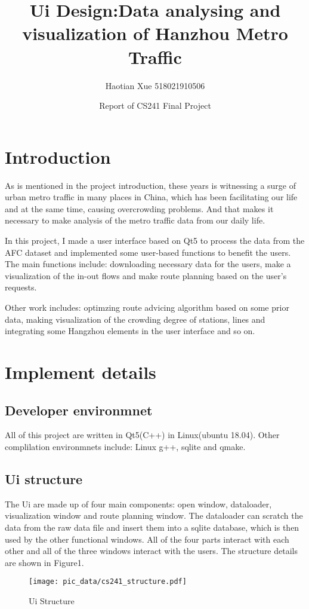 \documentclass{ctexart}
\begin{document}
\title{\textbf{Ui Design:Data analysing and visualization of Hanzhou  Metro Traffic}}
\date{Report of CS241 Final Project}
\author{Haotian Xue 518021910506}
\maketitle

\section{Introduction}
  As is mentioned in the project introduction, these years is witnessing a surge of urban
metro traffic in many places in China, which has been facilitating our life and at the same time, 
causing overcrowding problems. And that makes it necessary to make analysis of the metro traffic data 
from our daily life. 


  In this project, I made a user interface based on Qt5 to process the data from the AFC dataset and 
implemented some user-based functions to benefit the users. The main functions include: downloading
necessary data for the users, make a visualization of the in-out flows and make route planning based 
on the user's requests. 

Other work includes: optimzing route advicing algorithm based on some 
prior data, making visualization of the crowding degree of stations, lines and integrating some
Hangzhou elements in the user interface and so on.




\section{Implement details}
\subsection{Developer environmnet}
   All of this project are written in Qt5(C++) in Linux(ubuntu 18.04). Other complilation environmnets include:
   Linux g++, sqlite and qmake.

\subsection{Ui structure}
  The Ui are made up of four main components: 
  open window, dataloader,  visualization window and route planning window. The dataloader can scratch the data 
  from the raw data file and insert them into a sqlite database, which is then used by the other functional windows.
  All of the four parts interact with each other and 
  all of the three windows interact with the users. The structure details are shown in Figure1.
\begin{figure}
    \centerline{\texttt{[image: pic\_data/cs241\_structure.pdf]}}
    \caption{Ui Structure}
    \end{figure}
\end{document}
